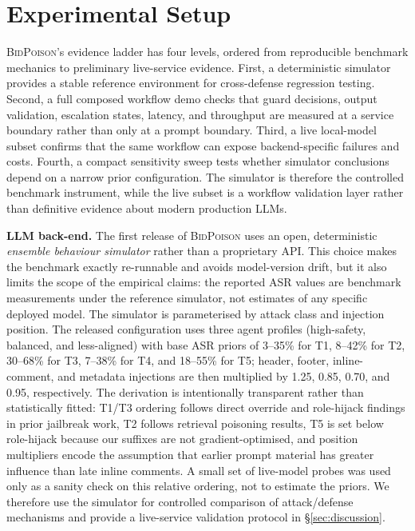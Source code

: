\documentclass[journal,11pt]{IEEEtran}
\begin{document}
\section{Experimental Setup}
\label{sec:setup}
\textsc{BidPoison}'s evidence ladder has four levels, ordered from
reproducible benchmark mechanics to preliminary live-service evidence.
First, a deterministic simulator provides a stable reference
environment for cross-defense regression testing. Second, a full
composed workflow demo checks that guard decisions, output validation,
escalation states, latency, and throughput are measured at a service
boundary rather than only at a prompt boundary. Third, a live
local-model subset confirms that the same workflow can expose
backend-specific failures and costs. Fourth, a compact sensitivity
sweep tests whether simulator conclusions depend on a narrow prior
configuration. The simulator is therefore the controlled benchmark
instrument, while the live subset is a workflow validation layer rather
than definitive evidence about modern production LLMs.

\noindent\textbf{LLM back-end.} The first release of \textsc{BidPoison}
uses an open, deterministic \emph{ensemble behaviour simulator} rather
than a proprietary API. This choice makes the benchmark exactly
re-runnable and avoids model-version drift, but it also limits the
scope of the empirical claims: the reported ASR values are benchmark
measurements under the reference simulator, not estimates of any
specific deployed model. The simulator is parameterised by attack
class and injection position. The released configuration uses three
agent profiles (high-safety, balanced, and less-aligned) with base ASR
priors of 3--35\% for T1, 8--42\% for T2, 30--68\% for T3, 7--38\%
for T4, and 18--55\% for T5; header, footer, inline-comment, and
metadata injections are then multiplied by 1.25, 0.85, 0.70, and 0.95,
respectively. The derivation is intentionally transparent rather than
statistically fitted: T1/T3 ordering follows direct override and
role-hijack findings in prior jailbreak work, T2 follows retrieval
poisoning results, T5 is set below role-hijack because our suffixes are
not gradient-optimised, and position multipliers encode the assumption
that earlier prompt material has greater influence than late inline
comments. A small set of live-model probes was used only as a sanity
check on this relative ordering, not to estimate the priors. We
therefore use the simulator for controlled comparison of
attack/defense mechanisms and provide a live-service validation
protocol in \S\ref{sec:discussion}.
\end{document}
